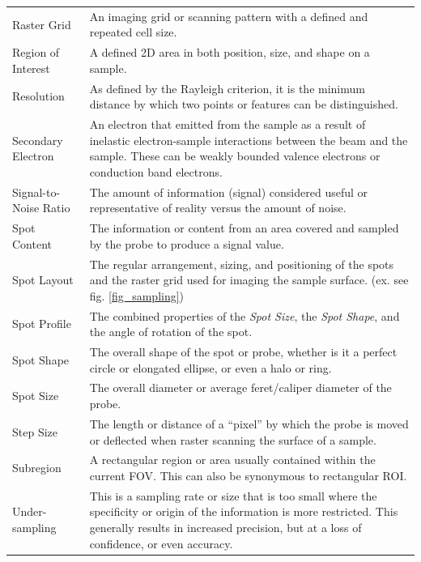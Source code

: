 \documentclass[12pt]{article}
\begin{document}
\begin{center}
\begin{longtable}{p{4.25cm} p{11.25cm}}
        Raster Grid & An imaging grid or scanning pattern with a defined and repeated cell size. \\
        
        Region of Interest & A defined 2D area in both position, size, and shape on a sample. \\
        
        Resolution & As defined by the Rayleigh criterion, it is the minimum distance by which two points or features can be distinguished. \\
        
        Secondary Electron & An electron that emitted from the sample as a result of inelastic electron-sample interactions between the beam and the sample. These can be weakly bounded valence electrons or conduction band electrons. \\
        
        Signal-to-Noise Ratio & The amount of information (signal) considered useful or representative of reality versus the amount of noise. \\

        Spot Content & The information or content from an area covered and sampled by the probe to produce a signal value. \\

        Spot Layout & The regular arrangement, sizing, and positioning of the spots and the raster grid used for imaging the sample surface. (ex. see fig. \ref{fig_sampling}) \\
        
        Spot Profile & The combined properties of the \textit{Spot Size}, the \textit{Spot Shape}, and the angle of rotation of the spot. \\

        Spot Shape & The overall shape of the spot or probe, whether is it a perfect circle or elongated ellipse, or even a halo or ring. \\
        
        Spot Size & The overall diameter or average feret/caliper diameter of the probe. \\
        
        Step Size & The length or distance of a ``pixel'' by which the probe is moved or deflected when raster scanning the surface of a sample. \\
        
        Subregion & A rectangular region or area usually contained within the current FOV. This can also be synonymous to rectangular ROI. \\

        Under-sampling & This is a sampling rate or size that is too small where the specificity or origin of the information is more restricted. This generally results in increased precision, but at a loss of confidence, or even accuracy. \\
        \bottomrule
    \end{longtable} 
\end{center}
\end{document}
